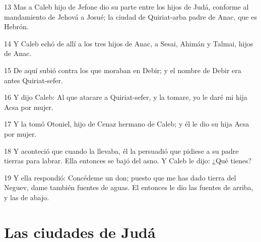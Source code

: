 \par 13 Mas a Caleb hijo de Jefone dio su parte entre los hijos de Judá, conforme al mandamiento de Jehová a Josué; la ciudad de Quiriat-arba padre de Anac, que es Hebrón. 
\par 14 Y Caleb echó de allí a los tres hijos de Anac, a Sesai, Ahimán y Talmai, hijos de Anac. 
\par 15 De aquí subió contra los que moraban en Debir; y el nombre de Debir era antes Quiriat-sefer.
\par 16 Y dijo Caleb: Al que atacare a Quiriat-sefer, y la tomare, yo le daré mi hija Acsa por mujer.
\par 17 Y la tomó Otoniel, hijo de Cenaz hermano de Caleb; y él le dio su hija Acsa por mujer.
\par 18 Y aconteció que cuando la llevaba, él la persuadió que pidiese a su padre tierras para labrar. Ella entonces se bajó del asno. Y Caleb le dijo: ¿Qué tienes?
\par 19 Y ella respondió: Concédeme un don; puesto que me has dado tierra del Neguev, dame también fuentes de aguas. El entonces le dio las fuentes de arriba, y las de abajo.

\section*{Las ciudades de Judá}

